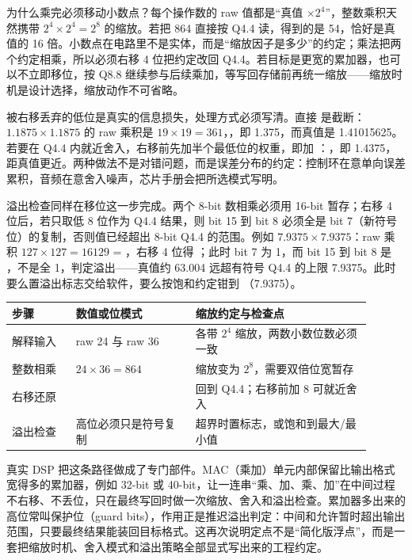 为什么乘完必须移动小数点？每个操作数的 raw 值都是“真值 $\times 2^{4}$”，整数乘积天然携带 $2^{4} \times 2^{4} = 2^{8}$ 的缩放。若把 864 直接按 Q4.4 读，得到的是 54，恰好是真值的 16 倍。小数点在电路里不是实体，而是“缩放因子是多少”的约定；乘法把两个约定相乘，所以必须右移 4 位把约定改回 Q4.4。若目标是更宽的累加器，也可以不立即移位，按 Q8.8 继续参与后续乘加，等写回存储前再统一缩放——缩放时机是设计选择，缩放动作不可省略。

被右移丢弃的低位是真实的信息损失，处理方式必须写清。直接  是截断：$1.1875 \times 1.1875$ 的 raw 乘积是 $19 \times 19 = 361$，，即 1.375，而真值是 1.41015625。若要在 Q4.4 内就近舍入，右移前先加半个最低位的权重，即加 ：，即 1.4375，距真值更近。两种做法不是对错问题，而是误差分布的约定：控制环在意单向误差累积，音频在意舍入噪声，芯片手册会把所选模式写明。

溢出检查同样在移位这一步完成。两个 8-bit 数相乘必须用 16-bit 暂存；右移 4 位后，若只取低 8 位作为 Q4.4 结果，则 bit 15 到 bit 8 必须全是 bit 7（新符号位）的复制，否则值已经超出 8-bit Q4.4 的范围。例如 $7.9375 \times 7.9375$：raw 乘积 $127 \times 127 = 16129$ = ，右移 4 位得 ；此时 bit 7 为 1，而 bit 15 到 bit 8 是 ，不是全 1，判定溢出——真值约 63.004 远超有符号 Q4.4 的上限 7.9375。此时要么置溢出标志交给软件，要么按饱和约定钳到 （7.9375）。

\begin{longtable}{L{0.16\linewidth}L{0.3\linewidth}L{0.44\linewidth}}
\toprule
步骤 & 数值或位模式 & 缩放约定与检查点 \\
\midrule
解释输入 & raw 24 与 raw 36 & 各带 $2^{4}$ 缩放，两数小数位数必须一致 \\\tablerowrule
整数相乘 & $24 \times 36 = 864$ & 缩放变为 $2^{8}$，需要双倍位宽暂存 \\\tablerowrule
右移还原 &  & 回到 Q4.4；右移前加 8 可就近舍入 \\\tablerowrule
溢出检查 & 高位必须只是符号复制 & 超界时置标志，或饱和到最大/最小值 \\
\bottomrule
\end{longtable}

真实 DSP 把这条路径做成了专门部件。MAC（乘加）单元内部保留比输出格式宽得多的累加器，例如 32-bit 或 40-bit，让一连串“乘、加、乘、加”在中间过程不右移、不丢位，只在最终写回时做一次缩放、舍入和溢出检查。累加器多出来的高位常叫保护位（guard bits），作用正是推迟溢出判定：中间和允许暂时超出输出范围，只要最终结果能装回目标格式。这再次说明定点不是“简化版浮点”，而是一套把缩放时机、舍入模式和溢出策略全部显式写出来的工程约定。

